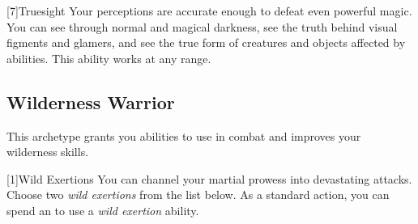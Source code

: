         [7]{Truesight} 
        Your perceptions are accurate enough to defeat even powerful magic.
        You can see through normal and magical darkness, see the truth behind visual figments and glamers, and see the true form of creatures and objects affected by  abilities.
        This ability works at any range.

    \subsection{Wilderness Warrior}
        This archetype grants you abilities to use in combat and improves your wilderness skills.

        [1]{Wild Exertions} 
        You can channel your martial prowess into devastating attacks.
        Choose two \textit{wild exertions} from the list below.
        As a standard action, you can spend an  to use a \textit{wild exertion} ability.
